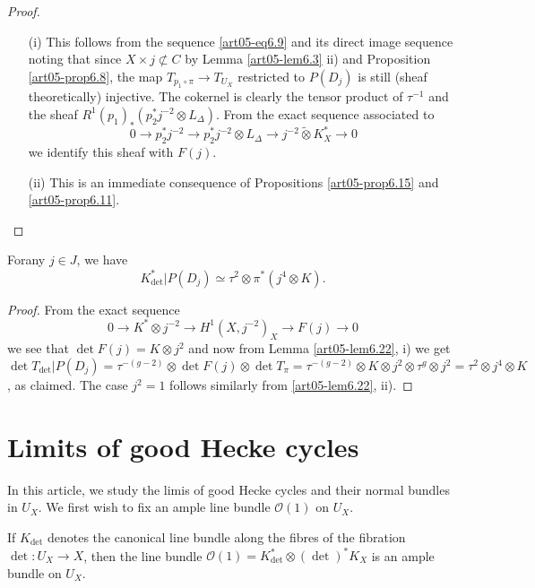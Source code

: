 \begin{proof}
\begin{itemize}
\item[\rm(i)] This follows from the sequence \eqref{art05-eq6.9} and
its direct image sequence noting that since $X\times j\nsubset C$ by
Lemma \ref{art05-lem6.3} ii) and Proposition \ref{art05-prop6.8}, the
map $T_{p_{1}\circ \pi}\to T_{U_{X}}$ restricted to $P(D_{j})$ is
still (sheaf theoretically) injective. The cokernel is clearly the
tensor product of $\tau^{-1}$ and the sheaf
$R^{1}(p_{1})_{*}(p^{*}_{2}j^{-2}\otimes L_{\Delta})$. From the exact
sequence associated to 
$$
0\to p^{*}_{2}j^{-2}\to p^{*}_{2}j^{-2}\otimes L_{\Delta}\to
j^{-2}\widetilde{\otimes} K^{*}_{X}\to 0
$$
we identify this sheaf with $F(j)$.

\item[\rm(ii)] This is an immediate consequence of
Propositions \ref{art05-prop6.15} and \ref{art05-prop6.11}.
\end{itemize}
\end{proof}

\begin{corollary}\label{art05-coro6.23}
For\pageoriginale any $j\in J$, we have
$$
K^{*}_{\det}|P(D_{j})\simeq \tau^{2}\otimes \pi^{*}(j^{4}\otimes K).
$$
\end{corollary}

\begin{proof}
From the exact sequence
$$
0\to K^{*}\otimes j^{-2}\to H^{1}(X,j^{-2})_{X}\to F(j)\to 0
$$
we see that $\det F(j)=K\otimes j^{2}$ and now from
Lemma \ref{art05-lem6.22}, i) we get $\det
T_{\det}|P(D_{j})=\tau^{-(g-2)}\otimes \det F(j)\otimes \det
T_{\pi}=\tau^{-(g-2)}\otimes K\otimes j^{2}\otimes \tau^{g}\otimes
j^{2}=\tau^{2}\otimes j^{4}\otimes K$, as claimed. The case $j^{2}=1$
follows similarly from  
\ref{art05-lem6.22}, ii). 
\end{proof}

\section{Limits of good Hecke cycles}\label{art05-sec7}

In this article, we study the limis of good Hecke cycles and their
normal bundles in $U_{X}$. We first wish to fix an ample line bundle
$\mathscr{O}(1)$ on $U_{X}$. 

\begin{lemma}\label{art05-lem7.1}
If $K_{\det}$ denotes the canonical line bundle along the fibres of
the fibration $\det : U_{X}\to X$, then the line bundle
$\mathscr{O}(1)=K^{*}_{\det}\otimes (\det)^{*}K_{X}$ is an ample
bundle on $U_{X}$.
\end{lemma}

